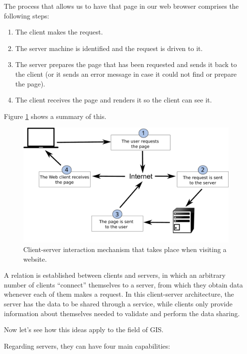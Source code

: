 The process that allows us to have that page in our web browser comprises the following steps:

\begin{enumerate}
	\item The client makes the request.
	\item The server machine is identified and the request is driven to it.
	\item The server prepares the page that has been requested and sends it back to the client (or it sends an error message in case it could not find or prepare the page).
	\item The client receives the page and renders it so the client can see it.
\end{enumerate}


Figure \ref{Fig:How_internet_works} shows a summary of this.

\begin{figure}[!hbt]   
\centering
\includegraphics[width=\columnwidth]{Software/How_internet_works.pdf}
\caption{\small Client-server interaction mechanism that takes place when visiting a website.}
\label{Fig:How_internet_works} 
\end{figure}

A relation is established between clients and servers, in which an arbitrary number of clients ``connect'' themselves to a server, from which they obtain data whenever each of them makes a request. In this client-server architecture, the server has the data to be shared through a service, while clients only provide information about themselves needed to validate and perform the data sharing.

Now let's see how this ideas apply to the field of GIS.

Regarding servers, they can have four main capabilities:

